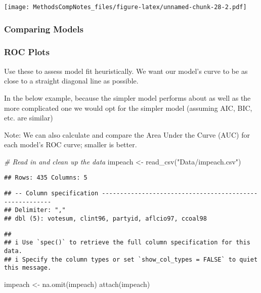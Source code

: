 \documentclass[
]{article}
\newenvironment{Shaded}{\begin{snugshade}}{\end{snugshade}}
\newcommand{\CommentTok}[1]{\textcolor[rgb]{0.56,0.35,0.01}{\textit{#1}}}
\newcommand{\FunctionTok}[1]{\textcolor[rgb]{0.00,0.00,0.00}{#1}}
\newcommand{\NormalTok}[1]{#1}
\newcommand{\OtherTok}[1]{\textcolor[rgb]{0.56,0.35,0.01}{#1}}
\newcommand{\StringTok}[1]{\textcolor[rgb]{0.31,0.60,0.02}{#1}}
\begin{document}
\texttt{[image: MethodsCompNotes\_files/figure-latex/unnamed-chunk-28-2.pdf]}

\hypertarget{comparing-models}{%
\subsubsection{Comparing Models}\label{comparing-models}}

\hypertarget{roc-plots}{%
\subsubsection{ROC Plots}\label{roc-plots}}

Use these to assess model fit heuristically. We want our model's curve
to be as close to a straight diagonal line as possible.

In the below example, because the simpler model performs about as well
as the more complicated one we would opt for the simpler model (assuming
AIC, BIC, etc. are similar)

Note: We can also calculate and compare the Area Under the Curve (AUC)
for each model's ROC curve; smaller is better.

\begin{Shaded}
\begin{Highlighting}[]
\CommentTok{\# Read in and clean up the data}
\NormalTok{impeach }\OtherTok{\textless{}{-}} \FunctionTok{read\_csv}\NormalTok{(}\StringTok{"Data/impeach.csv"}\NormalTok{)}
\end{Highlighting}
\end{Shaded}

\begin{verbatim}
## Rows: 435 Columns: 5
\end{verbatim}

\begin{verbatim}
## -- Column specification --------------------------------------------------------
## Delimiter: ","
## dbl (5): votesum, clint96, partyid, aflcio97, ccoal98
\end{verbatim}

\begin{verbatim}
## 
## i Use `spec()` to retrieve the full column specification for this data.
## i Specify the column types or set `show_col_types = FALSE` to quiet this message.
\end{verbatim}

\begin{Shaded}
\begin{Highlighting}[]
\NormalTok{impeach }\OtherTok{\textless{}{-}} \FunctionTok{na.omit}\NormalTok{(impeach)}
\FunctionTok{attach}\NormalTok{(impeach)}
\end{Highlighting}
\end{Shaded}
\end{document}
